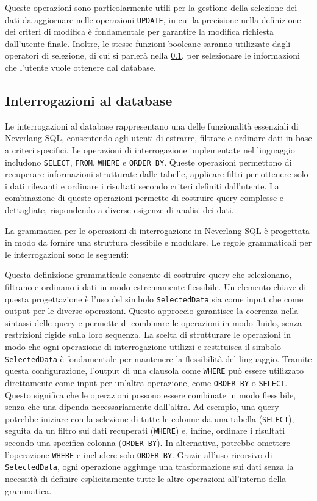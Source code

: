 \documentclass[12pt,a4paper,openright,twoside]{book}
\begin{document}
Queste operazioni sono particolarmente utili per la gestione della selezione dei dati da aggiornare nelle operazioni \texttt{UPDATE}, in cui 
la precisione nella definizione dei criteri di modifica è fondamentale per garantire la modifica richiesta dall'utente finale. 
Inoltre, le stesse funzioni booleane saranno utilizzate dagli operatori di selezione, di cui si parlerà nella 
\cref{subsec:interrogazioni}, per selezionare le informazioni che l'utente vuole ottenere dal database.

\subsection{Interrogazioni al database}
\label{subsec:interrogazioni}
Le interrogazioni al database rappresentano una delle funzionalità essenziali di Neverlang-SQL, consentendo agli utenti di estrarre, 
filtrare e ordinare dati in base a criteri specifici. Le operazioni di interrogazione implementate nel linguaggio includono \texttt{SELECT}, 
\texttt{FROM}, \texttt{WHERE} e \texttt{ORDER BY}. Queste operazioni permettono di recuperare informazioni strutturate dalle tabelle, applicare filtri per 
ottenere solo i dati rilevanti e ordinare i risultati secondo criteri definiti dall’utente. La combinazione di queste operazioni 
permette di costruire query complesse e dettagliate, rispondendo a diverse esigenze di analisi dei dati.

La grammatica per le operazioni di interrogazione in Neverlang-SQL è progettata in modo da fornire una struttura flessibile e 
modulare. Le regole grammaticali per le interrogazioni sono le seguenti:


Questa definizione grammaticale consente di costruire query che selezionano, filtrano e ordinano i dati in modo estremamente 
flessibile. Un elemento chiave di questa progettazione è l’uso del simbolo \texttt{SelectedData} sia come input che come output per 
le diverse operazioni. Questo approccio garantisce la coerenza nella sintassi delle query e permette di combinare le operazioni in 
modo fluido, senza restrizioni rigide sulla loro sequenza. La scelta di strutturare le operazioni in modo che ogni operazione di 
interrogazione utilizzi e restituisca il simbolo \texttt{SelectedData} è fondamentale per mantenere la flessibilità del linguaggio. 
Tramite questa configurazione, l’output di una clausola come \texttt{WHERE} può essere utilizzato direttamente come input per un’altra 
operazione, come \texttt{ORDER BY} o \texttt{SELECT}. Questo significa che le operazioni possono essere combinate in modo flessibile, senza che una 
dipenda necessariamente dall’altra. Ad esempio, una query potrebbe iniziare con la selezione di tutte le colonne da una tabella 
(\texttt{SELECT}), seguita da un filtro sui dati recuperati (\texttt{WHERE}) e, infine, ordinare i risultati secondo una 
specifica colonna (\texttt{ORDER BY}). In alternativa, potrebbe omettere l’operazione \texttt{WHERE} e includere solo \texttt{ORDER BY}. Grazie all’uso 
ricorsivo di \texttt{SelectedData}, ogni operazione aggiunge una trasformazione sui dati senza la necessità di definire 
esplicitamente tutte le altre operazioni all’interno della grammatica.
\end{document}
